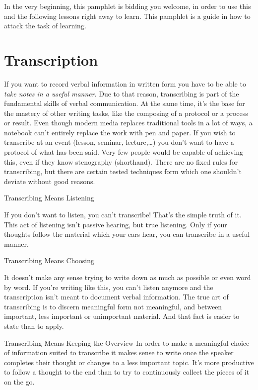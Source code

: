 \documentclass[../main.tex]{subfiles}
\begin{document}
In the very beginning, this pamphlet is bidding you welcome, in order to use this and the following lessons right away to learn.
This pamphlet is a guide in how to attack the task of learning.

\section{Transcription}
If you want to record verbal information in written form you have to be able to \emph{take notes in a useful manner}. Due to that reason, transcribing is part of the fundamental skills of verbal communication. At the same time, it's the base for the mastery of other writing tasks, like the composing of a protocol or a process or result.
Even though modern media replaces traditional tools in a lot of ways, a notebook can't entirely replace the work with pen and paper.
If you wish to transcribe at an event (lesson, seminar, lecture,\ldots ) you don't want to have a protocol of what has been said.
Very few people would be capable of achieving this, even if they know stenography (shorthand).
There are no fixed rules for transcribing, but there are certain tested techniques form which one shouldn't deviate without good reasons.

\begin{description}
\item{Transcribing Means Listening}

If you don't want to listen, you can't transcribe! That's the simple truth of it. This act of listening isn't passive hearing, but {true listening}. Only if your thoughts follow the material which your ears hear, you can transcribe in a useful manner.


\item{Transcribing Means Choosing}

It doesn't make any sense trying to write down as much as possible or even word by word.
If you're writing like this, you can't listen anymore and the transcription isn't meant to document verbal information.
The true art of transcribing is to discern meaningful form not meaningful, and between important, less important or unimportant material.
And that fact is easier to state than to apply.

\item{Transcribing Means Keeping the Overview}
In order to make a meaningful choice of information suited to transcribe it makes sense to write once the speaker completes their thought or changes to a less important topic.
It's more productive to follow a thought to the end than to try to continuously collect the pieces of it on the go.
\end{description}
\end{document}
